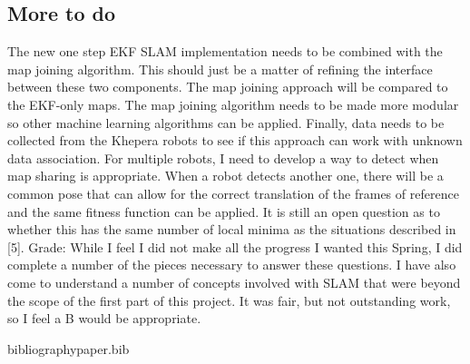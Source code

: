 \subsection{More to do}
The new one step EKF SLAM implementation needs to be combined with the map joining algorithm.  This should just be a matter of refining the interface between these two components.  The map joining approach will be compared to the EKF-only maps.  The map joining algorithm needs to be made more modular so other machine learning algorithms can be applied.  Finally, data needs to be collected from the Khepera robots to see if this approach can work with unknown data association.  
For multiple robots, I need to develop a way to detect when map sharing is appropriate.  When a robot detects another one, there will be a common pose that can allow for the correct translation of the frames of reference and the same fitness function can be applied.  It is still an open question as to whether this has the same number of local minima as the situations described in [5].
Grade:
While I feel I did not make all the progress I wanted this Spring, I did complete a number of the pieces necessary to answer these questions.  I have also come to understand a number of concepts involved with SLAM that were beyond the scope of the first part of this project.  It was fair, but not outstanding work, so I feel a B would be appropriate.

bibliography{paper.bib}{}



